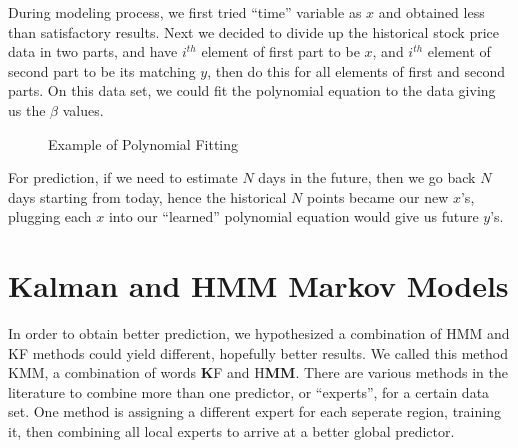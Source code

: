 During modeling process, we first tried ``time'' variable as $x$ and obtained
less than satisfactory results. Next we decided to divide up the historical
stock price data in two parts, and have $i^{th}$ element of first part to be
$x$, and $i^{th}$ element of second part to be its matching $y$, then do this
for all elements of first and second parts. On this data set, we could fit the
polynomial equation to the data giving us the $\beta$ values.

\begin{figure}[h]
\caption{Example of Polynomial Fitting}
\vspace{0.6cm}
\end{figure}

For prediction, if we need to estimate $N$ days in the future, then we go back
$N$ days starting from today, hence the historical $N$ points became our new
$x$'s, plugging each $x$ into our ``learned'' polynomial equation would give us
future $y$'s.

\section{Kalman and HMM Markov Models}

In order to obtain better prediction, we hypothesized a combination of HMM and
KF methods could yield different, hopefully better results. We called this
method KMM, a combination of words \textbf{K}F and H\textbf{MM}. There are
various methods in the literature to combine more than one predictor, or
``experts'', for a certain data set. One method is assigning a different expert
for each seperate region, training it, then combining all local experts to
arrive at a better global predictor.

